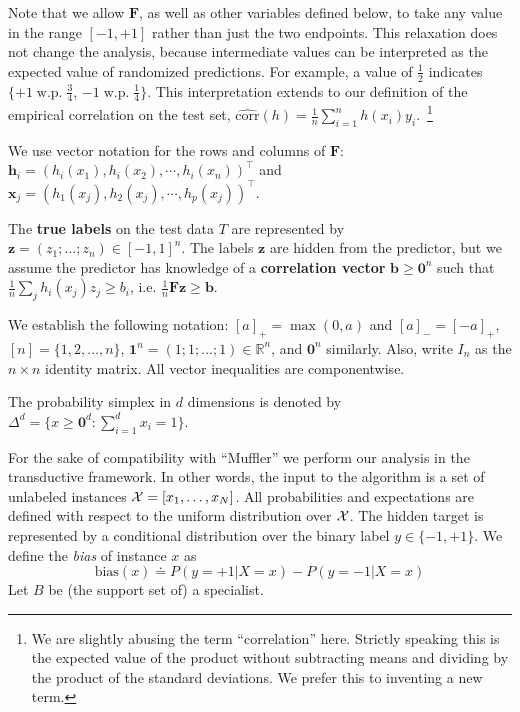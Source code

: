 \documentclass{colt2015} %
\newcommand{\corr}{\mbox{corr}}
\newcommand{\vF}{\mathbf{F}}
\newcommand{\vh}{\mathbf{h}}
\newcommand{\vx}{\mathbf{x}}
\newcommand{\vb}{\mathbf{b}}
\newcommand{\vz}{\mathbf{z}}
\newcommand{\vzero}{\mathbf{0}}
\newcommand{\vone}{\mathbf{1}}
\newcommand{\universe}[1]{{\cal #1}}
\newcommand{\bias}{\text{bias}}
\newcommand{\RR}{\mathbb{R}}      %
\begin{document}
Note that we allow $\vF$, as well as other variables defined below, to
take any value in the range $[-1,+1]$ rather than just the two
endpoints. This relaxation does not change the analysis, because intermediate
values can be interpreted as the expected value of randomized
predictions.  For example, a value of $\frac{1}{2}$ indicates $\{+1\;
\text{w.p.}\; \frac{3}{4} $, $-1\; \text{w.p.}\; \frac{1}{4} \}$. This
interpretation extends to our definition of the empirical correlation
on the test set,
$\hat{\corr}(h) = \frac{1}{n} \sum_{i=1}^n h(x_i)y_i$.~\footnote{We are slightly abusing the
  term ``correlation'' here. Strictly speaking this is the expected
  value of the product without subtracting means and dividing by the
  product of the standard deviations. We prefer this to
  inventing a new term.}

We use vector notation for the rows and columns of $\vF$: 
$\vh_i = (h_i(x_1), h_i(x_2), \cdots, h_i (x_n))^\top$ and \\$\vx_j =
(h_1(x_j), h_2(x_j), \cdots, h_p (x_j))^\top$.

The \textbf{true labels} on the test data $T$ are represented by $\vz
= (z_1; \dots; z_n) \in [-1,1]^n$. The labels $\vz$ are hidden from the predictor, 
but we assume the predictor has knowledge of a {\bf correlation vector}
$\vb \geq \vzero^n$ such that $ \frac{1}{n} \sum_j h_i (x_j) z_j \geq b_i$, 
i.e. $ \frac{1}{n} \vF \vz \geq \vb$. 

We establish the following notation: $[a]_{+} = \max (0, a)$ and $[a]_{-} = [-a]_{+}$,  
$[n] = \{ 1,2,\dots,n \}$, $\vone^n = (1; 1; \dots; 1) \in \RR^n$, and $\vzero^n$
similarly.  Also, write $I_n$ as the $n \times n$ identity matrix.
All vector inequalities are componentwise. 

The probability simplex in $d$ dimensions is denoted by $\Delta^d = \{ x \geq \vzero^d : \sum_{i=1}^d x_i = 1 \}$.

\iffalse

For the sake of compatibility with ``Muffler'' we perform our analysis
in the transductive framework.
In other words, the input to the algorithm is a set of unlabeled instances $\universe{X} =
[x_1,\ldots,x_N]$. All probabilities and expectations are defined with
respect to the uniform distribution over $\universe{X}$. The hidden
target is represented by a conditional distribution over the binary label
$y \in \{-1,+1\}$. We define the {\em bias} of instance $x$ as
\[
\bias(x) \doteq P(y=+1|X=x) - P(y=-1|X=x)
\]
Let $B$ be (the support set of) a specialist. 
\end{document}

